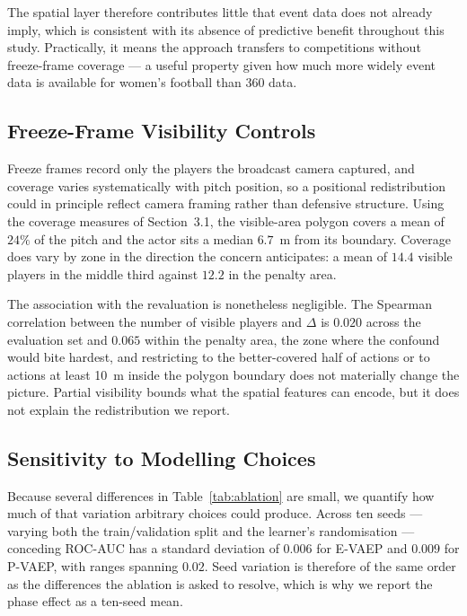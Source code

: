 \documentclass[runningheads]{llncs}
\begin{document}
The spatial layer therefore contributes little that event data does not already imply, which is consistent with its absence of predictive benefit throughout this study. Practically, it means the approach transfers to competitions without freeze-frame coverage --- a useful property given how much more widely event data is available for women's football than 360 data.

\subsection{Freeze-Frame Visibility Controls}
\label{sec:visibility}

Freeze frames record only the players the broadcast camera captured, and coverage varies systematically with pitch position, so a positional redistribution could in principle reflect camera framing rather than defensive structure. Using the coverage measures of Section~3.1, the visible-area polygon covers a mean of $24\%$ of the pitch and the actor sits a median $6.7$~m from its boundary. Coverage does vary by zone in the direction the concern anticipates: a mean of $14.4$ visible players in the middle third against $12.2$ in the penalty area.

The association with the revaluation is nonetheless negligible. The Spearman correlation between the number of visible players and $\Delta$ is $0.020$ across the evaluation set and $0.065$ within the penalty area, the zone where the confound would bite hardest, and restricting to the better-covered half of actions or to actions at least 10~m inside the polygon boundary does not materially change the picture. Partial visibility bounds what the spatial features can encode, but it does not explain the redistribution we report.

\subsection{Sensitivity to Modelling Choices}
\label{sec:sensitivity}

Because several differences in Table~\ref{tab:ablation} are small, we quantify how much of that variation arbitrary choices could produce. Across ten seeds --- varying both the train/validation split and the learner's randomisation --- conceding ROC-AUC has a standard deviation of $0.006$ for E-VAEP and $0.009$ for P-VAEP, with ranges spanning $0.02$. Seed variation is therefore of the same order as the differences the ablation is asked to resolve, which is why we report the phase effect as a ten-seed mean.
\end{document}
